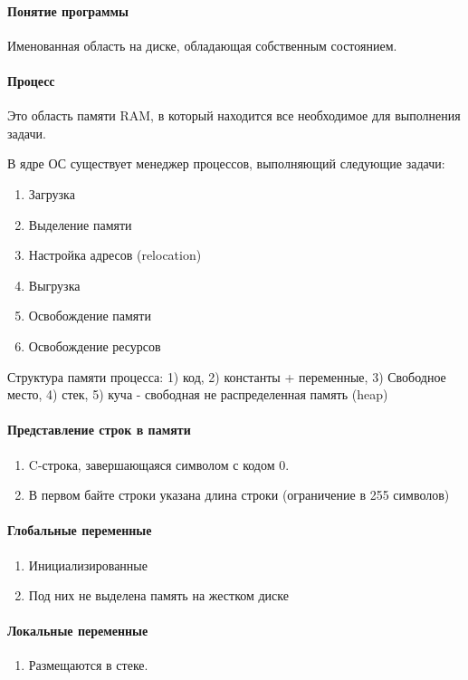 \documentclass[]{article}
\begin{document}
		\paragraph{Понятие программы}
		Именованная область на диске, обладающая собственным состоянием.
		\paragraph{Процесс} Это область памяти RAM, в который находится все необходимое для выполнения задачи.
		 
		В ядре ОС существует менеджер процессов, выполняющий следующие задачи:
		\begin{enumerate}
			\item Загрузка
			\item Выделение памяти
			\item Настройка адресов (relocation)
			\item Выгрузка
			\item Освобождение памяти
			\item Освобождение ресурсов
		\end{enumerate}
		
		Структура памяти процесса: 1) код, 2) константы + переменные, 3) Свободное место, 4) стек, 5) куча - свободная не распределенная память (heap)
		
		\paragraph{Представление строк в памяти}
		\begin{enumerate}
			\item C-строка, завершающаяся символом с кодом 0.
			\item В первом байте строки указана длина строки (ограничение в 255 символов)
		\end{enumerate}
		
		\paragraph{Глобальные переменные}
		\begin{enumerate}
			\item Инициализированные
			\item Под них не выделена память на жестком диске
		\end{enumerate}
		
		\paragraph{Локальные переменные}
		\begin{enumerate}
			\item Размещаются в стеке.
		\end{enumerate}
		
\end{document}
